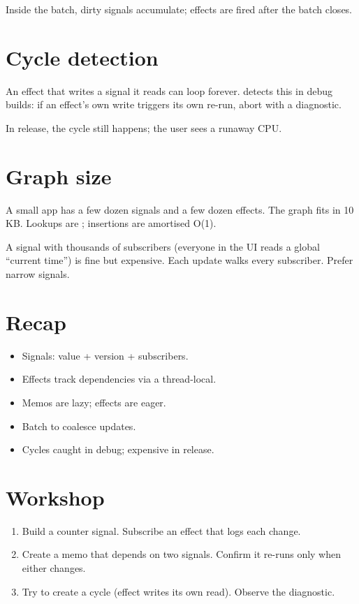 Inside the batch, dirty signals accumulate; effects are
fired after the batch closes.

\section{Cycle detection}

An effect that writes a signal it reads can loop forever.
\maya{} detects this in debug builds: if an effect's own
write triggers its own re-run, abort with a diagnostic.

In release, the cycle still happens; the user sees a
runaway CPU.

\section{Graph size}

A small app has a few dozen signals and a few dozen
effects. The graph fits in 10 KB. Lookups are
; insertions are amortised O(1).

\begin{warning}
A signal with thousands of subscribers (everyone in the UI
reads a global ``current time'') is fine but expensive. Each
update walks every subscriber. Prefer narrow signals.
\end{warning}

\section{Recap}

\begin{recap}
\begin{itemize}[leftmargin=*]
  \item Signals: value + version + subscribers.
  \item Effects track dependencies via a thread-local.
  \item Memos are lazy; effects are eager.
  \item Batch to coalesce updates.
  \item Cycles caught in debug; expensive in release.
\end{itemize}
\end{recap}

\section*{Workshop}

\begin{enumerate}[leftmargin=*]
  \item Build a counter signal. Subscribe an effect that
    logs each change.
  \item Create a memo that depends on two signals.
    Confirm it re-runs only when either changes.
  \item Try to create a cycle (effect writes its own
    read). Observe the diagnostic.
\end{enumerate}
